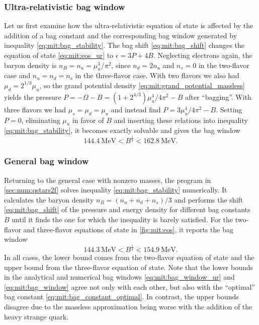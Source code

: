 \subsubsection{Ultra-relativistic bag window}

Let us first examine how the ultra-relativistic equation of state is affected by the addition of a bag constant
and the corresponding bag window generated by inequality \eqref{eq:mit:bag_stability}.
The bag shift \eqref{eq:mit:bag_shift} changes the equation of state \eqref{eq:mit:eos_ur} to $\epsilon = 3 P + 4 B$.
Neglecting electrons again, the baryon density is $n_B = n_u = \mu_u^3 / \pi^2$,
since $n_d = 2 n_u$ and $n_s=0$ in the two-flavor case and $n_u=n_d=n_s$ in the three-flavor case.
With two flavors we also had $\mu_d = 2^{1/3} \mu_u$,
so the grand potential density \eqref{eq:mit:grand_potential_massless}
yields the pressure $P = -\Omega - B = (1 + 2^{4/3}) \mu_u^4 / 4 \pi^2 - B$ after ``bagging''.
With three flavors we had $\mu_s = \mu_d = \mu_u$ and instead find $P = 3 \mu_u^4 / 4 \pi^2 - B$.
Setting $P=0$, eliminating $\mu_u$ in favor of $B$ and inserting these relations into inequality \eqref{eq:mit:bag_stability},
it becomes exactly solvable and gives the bag window
\begin{equation}
	\SI{144.4}{\mega\electronvolt} < B^\frac14 < \SI{162.8}{\mega\electronvolt}.
\label{eq:mit:bag_window_ur}
\end{equation}

\subsubsection{General bag window}

Returning to the general case with nonzero masses,
the program in \cref{sec:num:qstars2f} solves inequality \eqref{eq:mit:bag_stability} numerically.
It calculates the baryon density $n_B = (n_u+n_d+n_s)/3$
and performs the shift \eqref{eq:mit:bag_shift} of the pressure and energy density for different bag constants $B$
until it finds the one for which the inequality is barely satisfied.
For the two-flavor and three-flavor equations of state in \cref{fig:mit:eos}, it reports the bag window
\begin{equation}
	\SI{144.3}{\mega\electronvolt} < B^\frac14 < \SI{154.9}{\mega\electronvolt} .
\label{eq:mit:bag_window}
\end{equation}
In all cases, the lower bound comes from the two-flavor equation of state and the upper bound from the three-flavor equation of state.
Note that the lower bounds in the analytical and numerical bag windows \eqref{eq:mit:bag_window_ur} and \eqref{eq:mit:bag_window}
agree not only with each other, but also with the ``optimal'' bag constant \eqref{eq:mit:bag_constant_optimal}.
In contrast, the upper bounds disagree due to the massless approximation being worse with the addition of the heavy strange quark.


